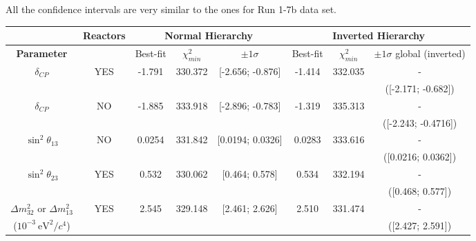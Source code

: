 All the confidence intervals are very similar to the ones for Run 1-7b data set.

\begin{table}[htb]
\centering
\begin{tabular}{| c | c || c | c | c || c | c | c |}
\hline
								& {\bf Reactors}		& \multicolumn{3}{c||}{\bf Normal Hierarchy} & \multicolumn{3}{c|}{\bf Inverted Hierarchy} \\
\hline										
\bf Parameter						&				& Best-fit	& $\chi^2_{min}$	& $\pm 1\sigma$ 	  	 	& Best-fit		& $\chi^2_{min}$ 	& $\pm 1\sigma$ global (inverted) 	 \\
\hline
$\delta_{CP}$             				& YES      			& -1.791  	& 330.372			& [-2.656; -0.876]			& -1.414		& 332.035			& -							\\
								& 				& 		&	 			& 						& 			& 				& ([-2.171; -0.682])				\\ 
\hline
$\delta_{CP}$            				& NO        			& -1.885  	& 333.918			& [-2.896; -0.783]	  		& -1.319		& 335.313			& -				\\
								& 				& 		& 				& 						& 			& 				& ([-2.243; -0.4716]) 				\\ 
\hline
$\sin^2 \theta_{13}$    				& NO             		& 0.0254  	& 331.842			& [0.0194; 0.0326]   			& 0.0283		& 333.616			& -							\\
								& 				& 		& 				& 						& 			& 				& ([0.0216; 0.0362]) 				\\ 
\hline
$\sin^2 \theta_{23}$                      		& YES       		& 0.532	& 330.062			& [0.464; 0.578]			& 0.534		& 332.194			& -                 					\\
								& 				& 		& 				& 						& 			& 				& ([0.468; 0.577])			  	\\ 
\hline
$\Delta m^2_{32}$ or $\Delta m^2_{13}$   & YES  			& 2.545 	& 329.148 		& [2.461; 2.626]			& 2.510 		& 331.474			& -     						\\
($10^{-3} ~\text{eV}^2 / c^4$) 			& 				& 		&				&						&			&				& ([2.427; 2.591])				\\


\end{tabular}
\end{table}
